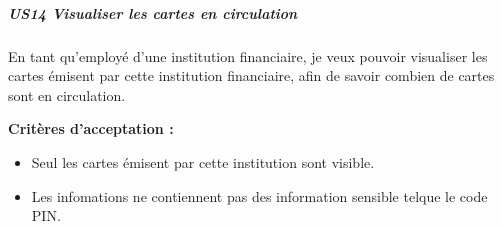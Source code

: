 \hypertarget{us14-visualiser-les-cartes-en-circulation}{%
\subparagraph{US14 Visualiser les cartes en
circulation}\label{us14-visualiser-les-cartes-en-circulation}}

En tant qu'employé d'une institution financiaire, je veux pouvoir
visualiser les cartes émisent par cette institution financiaire, afin de
savoir combien de cartes sont en circulation.

\textbf{Critères d'acceptation :}

\begin{itemize}
\tightlist
\item
  Seul les cartes émisent par cette institution sont visible.
\item
  Les infomations ne contiennent pas des information sensible telque le
  code PIN.
\end{itemize}

